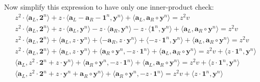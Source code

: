 \documentclass[../../book.tex]{subfiles}
\begin{document}
Now simplify this expression to have only one inner-product check:
\small
\begin{equation*}
    \begin{aligned}
        & z^2 \cdot \langle \mathbf{a}_L, \mathbf{2}^n \rangle + z \cdot \langle \mathbf{a}_L - \mathbf{a}_R - \mathbf{1}^n, \mathbf{y}^n \rangle + \langle \mathbf{a}_L, \mathbf{a}_R \circ \mathbf{y}^n \rangle = z^2v \\
        & z^2 \cdot \langle \mathbf{a}_L, \mathbf{2}^n \rangle + \boxed{z \cdot \langle \mathbf{a}_L, \mathbf{y}^n \rangle - z \cdot \langle \mathbf{a}_R, \mathbf{y}^n \rangle - z \cdot \langle \mathbf{1}^n, \mathbf{y}^n \rangle} + \langle \mathbf{a}_L, \mathbf{a}_R \circ \mathbf{y}^n \rangle = z^2v \\
        & z^2 \cdot \langle \mathbf{a}_L, \mathbf{2}^n \rangle + \boxed{\langle \mathbf{a}_L, z \cdot \mathbf{y}^n \rangle + \langle - \mathbf{a}_R, z \cdot \mathbf{y}^n \rangle + \langle - z \cdot \mathbf{1}^n, \mathbf{y}^n \rangle} + \langle \mathbf{a}_L, \mathbf{a}_R \circ \mathbf{y}^n \rangle = z^2v \\
        & z^2 \cdot \langle \mathbf{a}_L, \mathbf{2}^n \rangle + \langle \mathbf{a}_L, z \cdot \mathbf{y}^n \rangle + \boxed{\langle \mathbf{a}_R \circ \mathbf{y}^n, - z \cdot \mathbf{1}^n \rangle} + \langle \mathbf{a}_L, \mathbf{a}_R \circ \mathbf{y}^n \rangle = z^2v + \boxed{\langle z \cdot \mathbf{1}^n, \mathbf{y}^n \rangle} \\
        & \boxed{\langle \mathbf{a}_L, z^2 \cdot \mathbf{2}^n + z \cdot \mathbf{y}^n \rangle}  + \langle \mathbf{a}_R \circ \mathbf{y}^n, - z \cdot \mathbf{1}^n \rangle + \boxed{\langle\mathbf{a}_L, \mathbf{a}_R \circ \mathbf{y}^n \rangle} = z^2v + \langle z \cdot \mathbf{1}^n, \mathbf{y}^n \rangle \\
        & \boxed{\langle \mathbf{a}_L, z^2 \cdot \mathbf{2}^n + z \cdot \mathbf{y}^n + \mathbf{a}_R \circ \mathbf{y}^n\rangle}  + \langle \mathbf{a}_R \circ \mathbf{y}^n, - z \cdot \mathbf{1}^n \rangle = z^2v + \langle z \cdot \mathbf{1}^n, \mathbf{y}^n \rangle \\
    \end{aligned}
\end{equation*}
\normalsize
\end{document}
